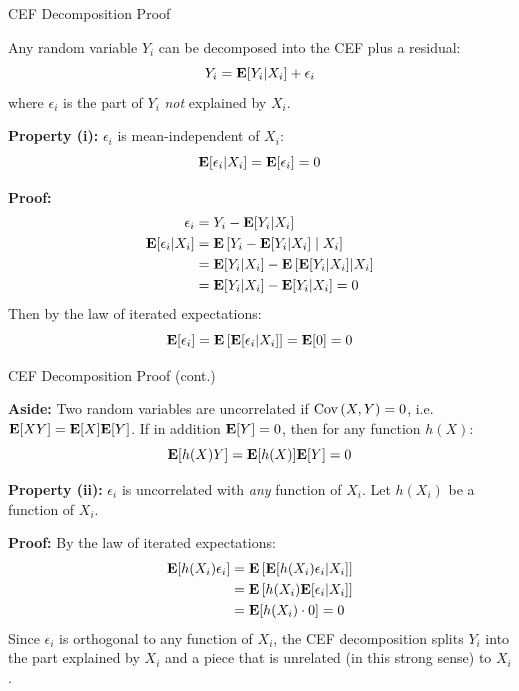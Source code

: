 \documentclass[compress, 8pt]{beamer}
\begin{document}
\begin{frame}{CEF Decomposition Proof}

Any random variable $Y_i$ can be decomposed into the CEF plus a residual:
\begin{equation*}
    Y_i = \mathbf{E} [Y_i \vert X_i] + \epsilon_i
\end{equation*}
where $\epsilon_i$ is the part of $Y_i$ \emph{not} explained by $X_i$.

\vspace{2ex}
\textbf{Property (i):} $\epsilon_i$ is mean-independent of $X_i$:
\begin{equation*}
    \mathbf{E} [\epsilon_i \vert X_i] = \mathbf{E} [\epsilon_i] = 0
\end{equation*}

\textbf{Proof:}
\begin{align*}
    \epsilon_i &= Y_i - \mathbf{E} [Y_i \vert X_i] \\
    \mathbf{E} [\epsilon_i \vert X_i] &= \mathbf{E} \left[ Y_i - \mathbf{E} [Y_i \vert X_i] \; \vert \; X_i \right] \\
    &= \mathbf{E} [Y_i \vert X_i] - \mathbf{E} \left[ \mathbf{E} [Y_i \vert X_i] \vert X_i \right] \\
    &= \mathbf{E} [Y_i \vert X_i] - \mathbf{E} [Y_i \vert X_i] = 0
\end{align*}
Then by the law of iterated expectations:
\begin{equation*}
    \mathbf{E} [\epsilon_i] = \mathbf{E} \left[ \mathbf{E} [\epsilon_i \vert X_i] \right] = \mathbf{E} [0] = 0
\end{equation*}

\end{frame}

\begin{frame}{CEF Decomposition Proof (cont.)}

\textbf{Aside:} Two random variables are uncorrelated if $\text{Cov} \left( X, Y \right) = 0$, i.e.\ $\mathbf{E} [XY] = \mathbf{E} [X] \mathbf{E} [Y]$. If in addition $\mathbf{E} [Y] = 0$, then for any function $h(X)$:
\begin{equation*}
    \mathbf{E} [h(X) Y] = \mathbf{E} [h(X)] \mathbf{E} [Y] = 0
\end{equation*}

\vspace{2ex}
\textbf{Property (ii):} $\epsilon_i$ is uncorrelated with \emph{any} function of $X_i$. Let $h(X_i)$ be a function of $X_i$.

\vspace{1ex}
\textbf{Proof:} By the law of iterated expectations:
\begin{align*}
    \mathbf{E} [h(X_i) \epsilon_i] &= \mathbf{E} \left[ \mathbf{E} [h(X_i) \epsilon_i \vert X_i] \right] \\
    &= \mathbf{E} \left[ h(X_i) \mathbf{E} [\epsilon_i \vert X_i] \right] \\
    &= \mathbf{E} [h(X_i) \cdot 0] = 0
\end{align*}
Since $\epsilon_i$ is orthogonal to any function of $X_i$, the CEF decomposition splits $Y_i$ into the part explained by $X_i$ and a piece that is unrelated (in this strong sense) to $X_i$.

\end{frame}
\end{document}

